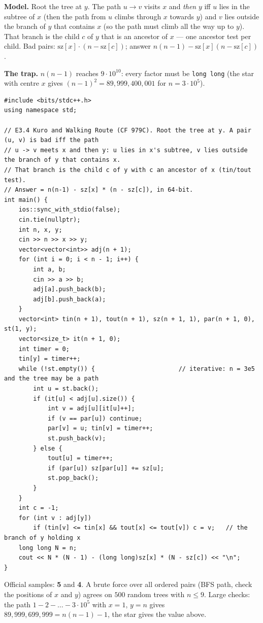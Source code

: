 \begin{solutionbox}
\textbf{Model.} Root the tree at $y$. The path $u \to v$ visits $x$ and \emph{then} $y$ iff $u$ lies in the subtree of $x$ (then the path from $u$ climbs through $x$ towards $y$) and $v$ lies outside the branch of $y$ that contains $x$ (so the path must climb all the way up to $y$). That branch is the child $c$ of $y$ that is an ancestor of $x$ --- one ancestor test per child. Bad pairs: $\mathrm{sz}[x] \cdot (n - \mathrm{sz}[c])$; answer $n(n-1) - \mathrm{sz}[x](n - \mathrm{sz}[c])$.

\textbf{The trap.} $n(n-1)$ reaches $9\cdot10^{10}$: every factor must be \texttt{long long} (the star with centre $x$ gives $(n-1)^2 = 89{,}999{,}400{,}001$ for $n = 3\cdot10^5$).
\begin{lstlisting}[style=cpp]
#include <bits/stdc++.h>
using namespace std;

// E3.4 Kuro and Walking Route (CF 979C). Root the tree at y. A pair (u, v) is bad iff the path
// u -> v meets x and then y: u lies in x's subtree, v lies outside the branch of y that contains x.
// That branch is the child c of y with c an ancestor of x (tin/tout test).
// Answer = n(n-1) - sz[x] * (n - sz[c]), in 64-bit.
int main() {
    ios::sync_with_stdio(false);
    cin.tie(nullptr);
    int n, x, y;
    cin >> n >> x >> y;
    vector<vector<int>> adj(n + 1);
    for (int i = 0; i < n - 1; i++) {
        int a, b;
        cin >> a >> b;
        adj[a].push_back(b);
        adj[b].push_back(a);
    }
    vector<int> tin(n + 1), tout(n + 1), sz(n + 1, 1), par(n + 1, 0), st(1, y);
    vector<size_t> it(n + 1, 0);
    int timer = 0;
    tin[y] = timer++;
    while (!st.empty()) {                       // iterative: n = 3e5 and the tree may be a path
        int u = st.back();
        if (it[u] < adj[u].size()) {
            int v = adj[u][it[u]++];
            if (v == par[u]) continue;
            par[v] = u; tin[v] = timer++;
            st.push_back(v);
        } else {
            tout[u] = timer++;
            if (par[u]) sz[par[u]] += sz[u];
            st.pop_back();
        }
    }
    int c = -1;
    for (int v : adj[y])
        if (tin[v] <= tin[x] && tout[x] <= tout[v]) c = v;   // the branch of y holding x
    long long N = n;
    cout << N * (N - 1) - (long long)sz[x] * (N - sz[c]) << "\n";
}
\end{lstlisting}
Official samples: \textbf{5} and \textbf{4}. A brute force over all ordered pairs (BFS path, check the positions of $x$ and $y$) agrees on $500$ random trees with $n \le 9$. Large checks: the path $1 - 2 - \dots - 3\cdot10^5$ with $x = 1$, $y = n$ gives $89{,}999{,}699{,}999 = n(n-1) - 1$, the star gives the value above.
\end{solutionbox}


